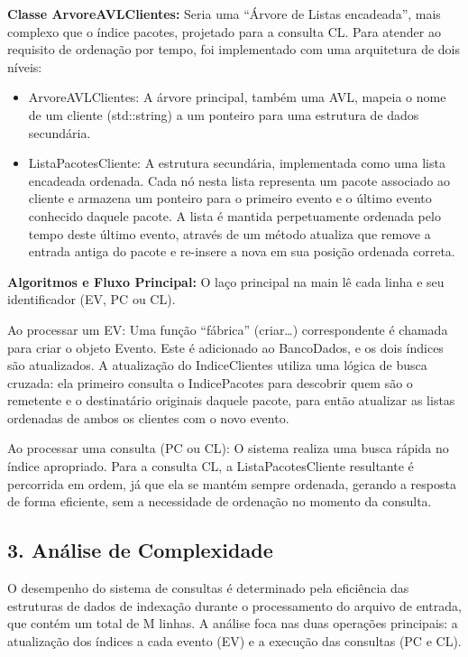\documentclass[
  12pt,
]{article}
\begin{document}
\textbf{Classe ArvoreAVLClientes:} Seria uma ``Árvore de Listas
encadeada'', mais complexo que o índice pacotes, projetado para a
consulta CL. Para atender ao requisito de ordenação por tempo, foi
implementado com uma arquitetura de dois níveis:

\begin{itemize}
\item
  ArvoreAVLClientes: A árvore principal, também uma AVL, mapeia o nome
  de um cliente (std::string) a um ponteiro para uma estrutura de dados
  secundária.
\item
  ListaPacotesCliente: A estrutura secundária, implementada como uma
  lista encadeada ordenada. Cada nó nesta lista representa um pacote
  associado ao cliente e armazena um ponteiro para o primeiro evento e o
  último evento conhecido daquele pacote. A lista é mantida
  perpetuamente ordenada pelo tempo deste último evento, através de um
  método atualiza que remove a entrada antiga do pacote e re-insere a
  nova em sua posição ordenada correta.
\end{itemize}

\textbf{Algoritmos e Fluxo Principal:} O laço principal na main lê cada
linha e seu identificador (EV, PC ou CL).

Ao processar um EV: Uma função ``fábrica'' (criar\ldots) correspondente
é chamada para criar o objeto Evento. Este é adicionado ao BancoDados, e
os dois índices são atualizados. A atualização do IndiceClientes utiliza
uma lógica de busca cruzada: ela primeiro consulta o IndicePacotes para
descobrir quem são o remetente e o destinatário originais daquele
pacote, para então atualizar as listas ordenadas de ambos os clientes
com o novo evento.

Ao processar uma consulta (PC ou CL): O sistema realiza uma busca rápida
no índice apropriado. Para a consulta CL, a ListaPacotesCliente
resultante é percorrida em ordem, já que ela se mantém sempre ordenada,
gerando a resposta de forma eficiente, sem a necessidade de ordenação no
momento da consulta.

\subsection{3. Análise de
Complexidade}\label{anuxe1lise-de-complexidade}

O desempenho do sistema de consultas é determinado pela eficiência das
estruturas de dados de indexação durante o processamento do arquivo de
entrada, que contém um total de M linhas. A análise foca nas duas
operações principais: a atualização dos índices a cada evento (EV) e a
execução das consultas (PC e CL).
\end{document}

